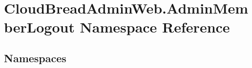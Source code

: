 \hypertarget{namespace_cloud_bread_admin_web_1_1_admin_member_logout}{}\section{Cloud\+Bread\+Admin\+Web.\+Admin\+Member\+Logout Namespace Reference}
\label{namespace_cloud_bread_admin_web_1_1_admin_member_logout}
\subsection*{Namespaces}
\begin{DoxyCompactItemize}
\end{DoxyCompactItemize}
